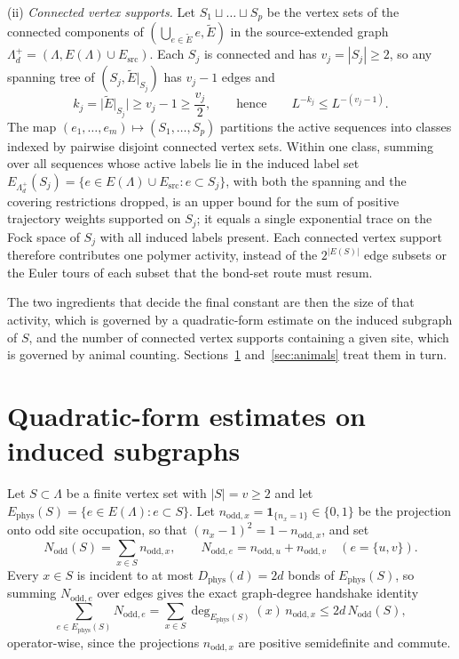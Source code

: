 \documentclass[11pt]{article}
\theoremstyle{plain}
\theoremstyle{definition}
\newcommand{\Nodd}{N_{\mathrm{odd}}}
\newcommand{\Dphys}{D_{\mathrm{phys}}}
\begin{document}
(ii) \emph{Connected vertex supports.} Let $S_1\sqcup\dots\sqcup S_p$ be the vertex
sets of the connected components of
$(\bigcup_{e\in\widetilde E}e,\widetilde E)$ in the source-extended graph
$\Lambda_d^+=(\Lambda,E(\Lambda)\cup E_{\mathrm{src}})$. Each $S_j$ is connected and
has $v_j=|S_j|\ge2$, so any spanning tree of $(S_j,\widetilde E|_{S_j})$ has
$v_j-1$ edges and
\begin{equation}\label{eq:handshakecount}
 k_j=\bigl|\widetilde E|_{S_j}\bigr|\ge v_j-1\ge\frac{v_j}{2},
 \qquad\text{hence}\qquad L^{-k_j}\le L^{-(v_j-1)} .
\end{equation}
The map $(e_1,\dots,e_m)\mapsto(S_1,\dots,S_p)$ partitions the active sequences into
classes indexed by pairwise disjoint connected vertex sets. Within one class, summing
over all sequences whose active labels lie in the induced label set
$E_{\Lambda_d^+}(S_j)=\{e\in E(\Lambda)\cup E_{\mathrm{src}}:e\subset S_j\}$, with
both the spanning and the covering restrictions dropped, is an upper bound for the
sum of positive trajectory weights supported on $S_j$; it equals a single
exponential trace on the Fock space of $S_j$ with all induced labels present. Each
connected vertex support therefore contributes one polymer activity, instead of the
$2^{|E(S)|}$ edge subsets or the Euler tours of each subset that the bond-set route
must resum.

The two ingredients that decide the final constant are then the size of that
activity, which is governed by a quadratic-form estimate on the induced subgraph of
$S$, and the number of connected vertex supports containing a given site, which is
governed by animal counting. Sections~\ref{sec:forms} and~\ref{sec:animals} treat
them in turn.

\section{Quadratic-form estimates on induced subgraphs}\label{sec:forms}

Let $S\subset\Lambda$ be a finite vertex set with $|S|=v\ge2$ and let
$E_{\mathrm{phys}}(S)=\{e\in E(\Lambda):e\subset S\}$. Let
$n_{\mathrm{odd},x}=\mathbf 1_{\{n_x=1\}}\in\{0,1\}$ be the projection onto odd site
occupation, so that $(n_x-1)^2=1-n_{\mathrm{odd},x}$, and set
\[
 \Nodd(S)=\sum_{x\in S}n_{\mathrm{odd},x},\qquad
 N_{\mathrm{odd},e}=n_{\mathrm{odd},u}+n_{\mathrm{odd},v}\quad(e=\{u,v\}).
\]
Every $x\in S$ is incident to at most $\Dphys(d)=2d$ bonds of
$E_{\mathrm{phys}}(S)$, so summing $N_{\mathrm{odd},e}$ over edges gives the exact
graph-degree handshake identity
\begin{equation}\label{eq:handshake}
 \sum_{e\in E_{\mathrm{phys}}(S)}N_{\mathrm{odd},e}
 =\sum_{x\in S}\deg_{E_{\mathrm{phys}}(S)}(x)\,n_{\mathrm{odd},x}
 \le 2d\,\Nodd(S),
\end{equation}
operator-wise, since the projections $n_{\mathrm{odd},x}$ are positive
semidefinite and commute.
\end{document}
